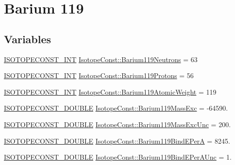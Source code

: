 \hypertarget{group___isotope_const-_barium-_ba119}{}\section{Barium 119}
\label{group___isotope_const-_barium-_ba119}
\subsection*{Variables}
\begin{DoxyCompactItemize}
\item 
\mbox{\hyperlink{group___isotope_const-_macros_ga5f18360b3e99483a35c32d789e62621c}{I\+S\+O\+T\+O\+P\+E\+C\+O\+N\+S\+T\+\_\+\+I\+NT}} \mbox{\hyperlink{group___isotope_const-_barium-_ba119_ga8210eca65f8c93b7c3b1941589cb1b1a}{Isotope\+Const\+::\+Barium119\+Neutrons}} = 63
\item 
\mbox{\hyperlink{group___isotope_const-_macros_ga5f18360b3e99483a35c32d789e62621c}{I\+S\+O\+T\+O\+P\+E\+C\+O\+N\+S\+T\+\_\+\+I\+NT}} \mbox{\hyperlink{group___isotope_const-_barium-_ba119_gafa11d63b97d25cbbd494594cc46e9c9e}{Isotope\+Const\+::\+Barium119\+Protons}} = 56
\item 
\mbox{\hyperlink{group___isotope_const-_macros_ga5f18360b3e99483a35c32d789e62621c}{I\+S\+O\+T\+O\+P\+E\+C\+O\+N\+S\+T\+\_\+\+I\+NT}} \mbox{\hyperlink{group___isotope_const-_barium-_ba119_gafb2a47773e2296ec7de6a0533fa16d87}{Isotope\+Const\+::\+Barium119\+Atomic\+Weight}} = 119
\item 
\mbox{\hyperlink{group___isotope_const-_macros_ga8f45a7272ce02c0b4c65c44636ed719a}{I\+S\+O\+T\+O\+P\+E\+C\+O\+N\+S\+T\+\_\+\+D\+O\+U\+B\+LE}} \mbox{\hyperlink{group___isotope_const-_barium-_ba119_ga73a0647d3a542e3767c1d1653628681c}{Isotope\+Const\+::\+Barium119\+Mass\+Exc}} = -\/64590.
\item 
\mbox{\hyperlink{group___isotope_const-_macros_ga8f45a7272ce02c0b4c65c44636ed719a}{I\+S\+O\+T\+O\+P\+E\+C\+O\+N\+S\+T\+\_\+\+D\+O\+U\+B\+LE}} \mbox{\hyperlink{group___isotope_const-_barium-_ba119_ga27df7ed41994257b8dbbeb71d844e356}{Isotope\+Const\+::\+Barium119\+Mass\+Exc\+Unc}} = 200.
\item 
\mbox{\hyperlink{group___isotope_const-_macros_ga8f45a7272ce02c0b4c65c44636ed719a}{I\+S\+O\+T\+O\+P\+E\+C\+O\+N\+S\+T\+\_\+\+D\+O\+U\+B\+LE}} \mbox{\hyperlink{group___isotope_const-_barium-_ba119_gafee699b1ffe2cf67b76bbd6892aa091a}{Isotope\+Const\+::\+Barium119\+Bind\+E\+PerA}} = 8245.
\item 
\mbox{\hyperlink{group___isotope_const-_macros_ga8f45a7272ce02c0b4c65c44636ed719a}{I\+S\+O\+T\+O\+P\+E\+C\+O\+N\+S\+T\+\_\+\+D\+O\+U\+B\+LE}} \mbox{\hyperlink{group___isotope_const-_barium-_ba119_gadbd920e2b01bbdb4da894ce0fe846f4a}{Isotope\+Const\+::\+Barium119\+Bind\+E\+Per\+A\+Unc}} = 1.

\end{DoxyCompactItemize}
